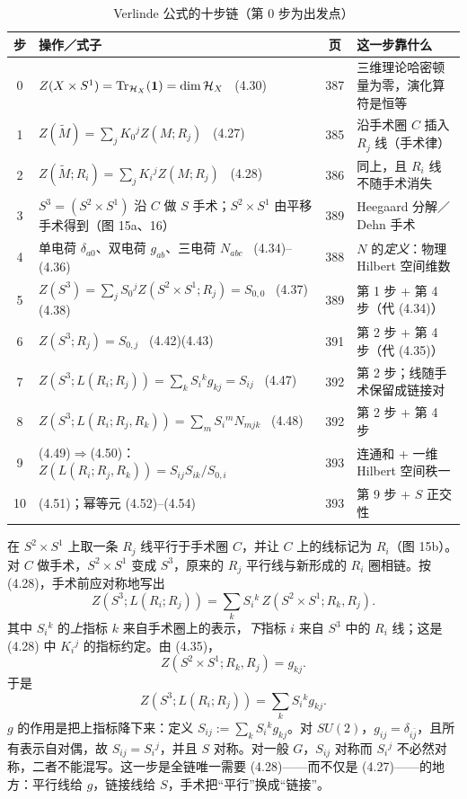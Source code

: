 \begin{table}[htbp]
\centering
\small
\caption{Verlinde 公式的十步链（第 $0$ 步为出发点）}
\label{tab:tenstep}
\begin{tabular}{@{}c >{\raggedright\arraybackslash}p{8.1cm} c >{\raggedright\arraybackslash}p{4.3cm}@{}}
\toprule
步 & 操作／式子 & 页 & 这一步靠什么 \\
\midrule
0 & $Z(X\times S^1)=\operatorname{Tr}_{\mathcal{H}_X}(\mathbf 1)=\dim\mathcal{H}_X$ \ (4.30) & 387 & 三维理论哈密顿量为零，演化算符是恒等 \\
1 & $Z(\widetilde M)=\sum_j K_0{}^j Z(M;R_j)$ \ (4.27) & 385 & 沿手术圈 $C$ 插入 $R_j$ 线（手术律）\\
2 & $Z(\widetilde M;R_i)=\sum_j K_i{}^j Z(M;R_j)$ \ (4.28) & 386 & 同上，且 $R_i$ 线不随手术消失 \\
3 & $S^3=(S^2\times S^1)$ 沿 $C$ 做 $S$ 手术；$S^2\times S^1$ 由平移手术得到（图 15a、16） & 389 & Heegaard 分解／Dehn 手术 \\
4 & 单电荷 $\delta_{a0}$、双电荷 $g_{ab}$、三电荷 $N_{abc}$ \ (4.34)--(4.36) & 388 & $N$ 的\emph{定义}：物理 Hilbert 空间维数 \\
5 & $Z(S^3)=\sum_j S_0{}^j Z(S^2\times S^1;R_j)=S_{0,0}$ \ (4.37)(4.38) & 389 & 第 1 步 + 第 4 步（代 (4.34)）\\
6 & $Z(S^3;R_j)=S_{0,j}$ \ (4.42)(4.43) & 391 & 第 2 步 + 第 4 步（代 (4.35)）\\
7 & $Z(S^3;L(R_i;R_j))=\sum_k S_i{}^k g_{kj}=S_{ij}$ \ (4.47) & 392 & 第 2 步；线随手术保留成链接对 \\
8 & $Z(S^3;L(R_i;R_j,R_k))=\sum_m S_i{}^m N_{mjk}$ \ (4.48) & 392 & 第 2 步 + 第 4 步 \\
9 & (4.49)$\Rightarrow$(4.50)：$Z(L(R_i;R_j,R_k))=S_{ij}S_{ik}/S_{0,i}$ & 393 & 连通和 + 一维 Hilbert 空间秩一 \\
10 & (4.51)；幂等元 (4.52)--(4.54) & 393 & 第 9 步 + $S$ 正交性 \\
\bottomrule
\end{tabular}
\end{table}

\begin{derivation}[D-9.1：第 7 步，(4.47) 的来历]
在 $S^2\times S^1$ 上取一条 $R_j$ 线平行于手术圈 $C$，并让 $C$ 上的线标记为 $R_i$（图 15b）。对 $C$ 做手术，$S^2\times S^1$ 变成 $S^3$，原来的 $R_j$ 平行线与新形成的 $R_i$ 圈相链。按 (4.28)，手术前应对称地写出
\[
Z(S^3;L(R_i;R_j))=\sum_k S_i{}^k\,Z(S^2\times S^1;R_k,R_j).
\]
其中 $S_i{}^k$ 的\emph{上}指标 $k$ 来自手术圈上的表示，\emph{下}指标 $i$ 来自 $S^3$ 中的 $R_i$ 线；这是 (4.28) 中 $K_i{}^j$ 的指标约定。由 (4.35)，
\[
Z(S^2\times S^1;R_k,R_j)=g_{kj}.
\]
于是
\[
Z(S^3;L(R_i;R_j))=\sum_k S_i{}^k g_{kj}.
\]
$g$ 的作用是把上指标降下来：定义 $S_{ij}:=\sum_k S_i{}^k g_{kj}$。对 $SU(2)$，$g_{ij}=\delta_{i\bar j}$，且所有表示自对偶，故 $S_{ij}=S_i{}^j$，并且 $S$ 对称。对一般 $G$，$S_{ij}$ 对称而 $S_i{}^j$ 不必然对称，二者不能混写。这一步是全链唯一需要 (4.28)——而不仅是 (4.27)——的地方：平行线给 $g$，链接线给 $S$，手术把“平行”换成“链接”。\ours
\end{derivation}

